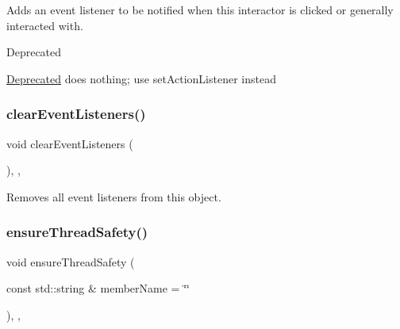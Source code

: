 Adds an event listener to be notified when this interactor is clicked or generally interacted with. 

\begin{DoxyRefDesc}{Deprecated}
\item[\mbox{\hyperlink{deprecated__deprecated000006}{Deprecated}}]does nothing; use set\+Action\+Listener instead \end{DoxyRefDesc}
\mbox{\label{classsgl_1_1GObservable_a80cfa040459ff53594adbd6a51ec8f43}} 
\subsubsection{\texorpdfstring{clear\+Event\+Listeners()}{clearEventListeners()}}
{\footnotesize\ttfamily void clear\+Event\+Listeners (\begin{DoxyParamCaption}{ }\end{DoxyParamCaption})\hspace{0.3cm}{\ttfamily [protected]}, {\ttfamily [virtual]}, {\ttfamily [inherited]}}



Removes all event listeners from this object. 

\mbox{\label{classsgl_1_1GObservable_a284f31528c0520f8e545c03ac9eeac74}} 
\subsubsection{\texorpdfstring{ensure\+Thread\+Safety()}{ensureThreadSafety()}}
{\footnotesize\ttfamily void ensure\+Thread\+Safety (\begin{DoxyParamCaption}\item[{const std\+::string \&}]{member\+Name = {\ttfamily \char`\"{}\char`\"{}} }\end{DoxyParamCaption})\hspace{0.3cm}{\ttfamily [protected]}, {\ttfamily [virtual]}, {\ttfamily [inherited]}}



